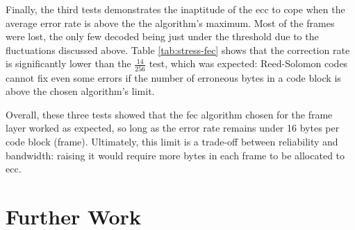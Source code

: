 Finally, the third tests demonstrates the inaptitude of the \acrshort{ecc}
to cope when the average error rate is above the the algorithm's maximum. Most
of the frames were lost, the only few decoded being just under the threshold
due to the fluctuations discussed above. Table \ref{tab:stress-fec} shows that
the correction rate is significantly lower than the $\frac{14}{256}$ test, which
was expected: Reed-Solomon codes cannot fix even some errors if the number of
erroneous bytes in a code block is above the chosen algorithm's limit.

Overall, these three tests showed that the \acrshort{fec} algorithm chosen for
the frame layer worked as expected, so long as the error rate remains under
16 bytes per code block (frame). Ultimately, this limit is a trade-off between
reliability and bandwidth: raising it would require more bytes in each frame
to be allocated to \acrlong{ecc}.

\section{Further Work} %
